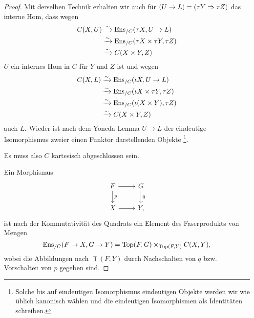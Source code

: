 \begin{proof}
  Mit derselben Technik erhalten wir auch für $(U \to L) = (\tau Y
  \Rightarrow \tau Z)$ das interne Hom, dass wegen
  \begin{align*}
    C(X, U)
    &\xrightarrow[]{\sim} \operatorname{Ens}_{/C}(\tau X, U \to L) \\
    &\xrightarrow[]{\sim} \operatorname{Ens}_{/C}(\tau X \times \tau Y, \tau Z) \\
    &\xrightarrow[]{\sim} C(X \times Y, Z)
  \end{align*}
  $U$ ein internes Hom in $C$ für $Y$ und $Z$ ist und wegen
  \begin{align*}
    C(X, L)
    &\xrightarrow[]{\sim} \operatorname{Ens}_{/C}(\iota X, U \to L) \\
    &\xrightarrow[]{\sim} \operatorname{Ens}_{/C}(\iota X \times \tau Y, \tau Z) \\
    &\xrightarrow[]{\sim} \operatorname{Ens}_{/C}(\iota (X \times Y), \tau Z) \\
    &\xrightarrow[]{\sim} C(X \times Y, Z)
  \end{align*}
  auch $L$. Wieder ist nach dem Yoneda-Lemma $U \to L$ der eindeutige
  Isomorphismus zweier einen Funktor darstellenden
  Objekte \footnote{Solche bis auf eindeutigen Isomorphismus
    eindeutigen Objekte werden wir wie üblich kanonisch wählen und die
    eindeutigen Isomorphismen als Identitäten schreiben.}.

  Es muss also $C$ kartesisch abgeschlossen sein.

  Ein Morphismus
  \[ \begin{tikzcd}
    F \arrow[r] \arrow{d}{p} & G \arrow{d}{q} \\
    X \arrow[r] & Y,
  \end{tikzcd} \]
  ist nach der Kommutativität des Quadrats ein Element des
  Faserprodukts von Mengen
  \[ \operatorname{Ens}_{/C}(F \to X, G \to Y) = \operatorname{Top}(F, G) \times_{\operatorname{Top}(F, Y)} C(X, Y), \]
  wobei die Abbildungen nach $\Top(F, Y)$ durch Nachschalten von $q$
  bzw. Vorschalten von $p$ gegeben sind.


\end{proof}
